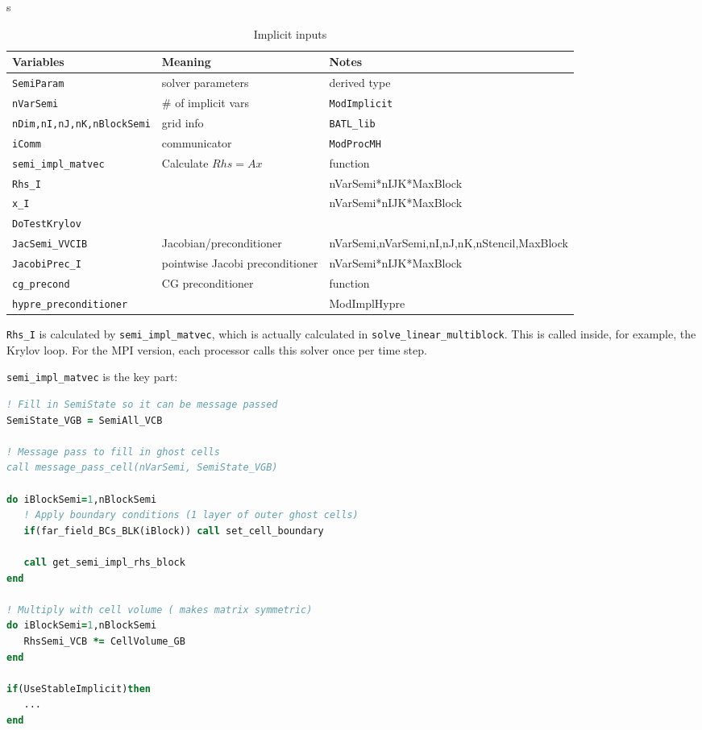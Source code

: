 \documentclass[11pt]{book} %
\begin{document}
\begin{table}[htbp]
  \centering
  \caption{Implicit inputs}s
 \begin{tabular}{lll}
    \toprule
Variables                & Meaning           & Notes\\
\midrule         
\verb|SemiParam| & solver parameters  & derived type \\
\verb|nVarSemi|    & \# of implicit vars    & \verb|ModImplicit| \\
\verb|nDim,nI,nJ,nK,nBlockSemi| & grid info   & \verb|BATL_lib| \\
\verb|iComm| & communicator & \verb|ModProcMH|  \\
\verb|semi_impl_matvec| & Calculate $Rhs = Ax$  & function \\
\verb|Rhs_I| &  & nVarSemi*nIJK*MaxBlock\\
\verb|x_I| & & nVarSemi*nIJK*MaxBlock\\
\verb|DoTestKrylov| & & \\
\verb|JacSemi_VVCIB| &  Jacobian/preconditioner & nVarSemi,nVarSemi,nI,nJ,nK,nStencil,MaxBlock\\
\verb|JacobiPrec_I| & pointwise Jacobi preconditioner &  nVarSemi*nIJK*MaxBlock\\
\verb|cg_precond| & CG preconditioner & function\\
\verb|hypre_preconditioner| & & ModImplHypre \\
    \bottomrule
    \end{tabular}
  \label{tab:impl_input}
\end{table}

\verb|Rhs_I| is calculated by \verb|semi_impl_matvec|, which is actually calculated in \verb|solve_linear_multiblock|. This is called inside, for example, the Krylov loop. For the MPI version, each processor calls this solver once per time step.

\verb|semi_impl_matvec| is the key part:
\begin{lstlisting}[language=Fortran, caption=Semi-implicit matvec]
! Fill in SemiState so it can be message passed
SemiState_VGB = SemiAll_VCB

! Message pass to fill in ghost cells
call message_pass_cell(nVarSemi, SemiState_VGB)

do iBlockSemi=1,nBlockSemi
   ! Apply boundary conditions (1 layer of outer ghost cells)
   if(far_field_BCs_BLK(iBlock)) call set_cell_boundary
   
   call get_semi_impl_rhs_block
end

! Multiply with cell volume ( makes matrix symmetric)
do iBlockSemi=1,nBlockSemi
   RhsSemi_VCB *= CellVolume_GB
end

if(UseStableImplicit)then
   ...
end
\end{lstlisting}
\end{document}
